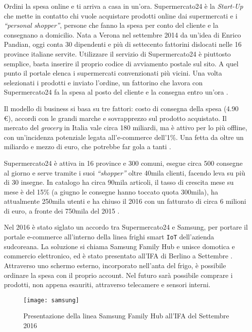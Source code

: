 Ordini la spesa online e ti arriva a casa in un'ora.
Supermercato24 è la \textit{Start-Up} che mette in contatto chi vuole acquistare prodotti online dai supermercati e i \textit{``personal shopper''}, persone che fanno la spesa per conto del cliente e la consegnano a domicilio.
Nata a Verona nel settembre 2014 da un'idea di Enrico Pandian, oggi conta 30 dipendenti e più di settecento fattorini dislocati nelle 16 province italiane servite.
Utilizzare il servizio di Supermercato24 è piuttosto semplice, basta inserire il proprio codice di avviamento postale sul sito.
A quel punto il portale elenca i supermercati convenzionati più vicini.
Una volta selezionati i prodotti e inviato l'ordine, un fattorino che lavora con Supermercato24 fa la spesa al posto del cliente e la consegna entro un'ora \cite{Supermercato24}.

Il modello di business si basa su tre fattori: costo di consegna della spesa (4.90 \euro{}), accordi con le grandi marche e sovrapprezzo sul prodotto acquistato.
Il mercato del \textit{grocery} in Italia vale circa 180 miliardi, ma è attivo per lo più offline, con un'incidenza potenziale legata all'e-commerce dell'1\%.
Una fetta da oltre un miliardo e mezzo di euro, che potrebbe far gola a tanti \cite{Pitch}.

Supermercato24 è attiva in 16 province e 300 comuni, esegue circa 500 consegne al giorno e serve tramite i suoi \textit{``shopper''} oltre 40mila clienti, facendo leva su più di 30 insegne.
In catalogo ha circa 90mila articoli, il tasso di crescita mese su mese è del 15\% (a giugno le consegne hanno toccato quota 300mila), ha attualmente 250mila utenti e ha chiuso il 2016 con un fatturato di circa 6 milioni di euro, a fronte dei 750mila del 2015 \cite{Aucap}.

Nel 2016 è stato siglato un accordo tra Supermercato24 e Samsung, per portare il portale e-commerce all'interno della linea frighi smart \verb+IoT+ dell'azienda sudcoreana.
La soluzione si chiama Samsung Family Hub e unisce domotica e commercio elettronico, ed è stato presentato all'IFA di Berlino a Settembre \cite{Samsung}.
Attraverso uno schermo esterno, incorporato nell'anta del frigo, è possibile ordinare la spesa con il proprio account.
Nel futuro sarà possibile comprare i prodotti, non appena esauriti, attraverso telecamere e sensori interni.

\begin{figure}[H]
  \centering
  \texttt{[image: samsung]}
  \caption{Presentazione della linea Samsung Family Hub all'IFA del Settembre 2016}
  \label{fig:samsung}
\end{figure}


